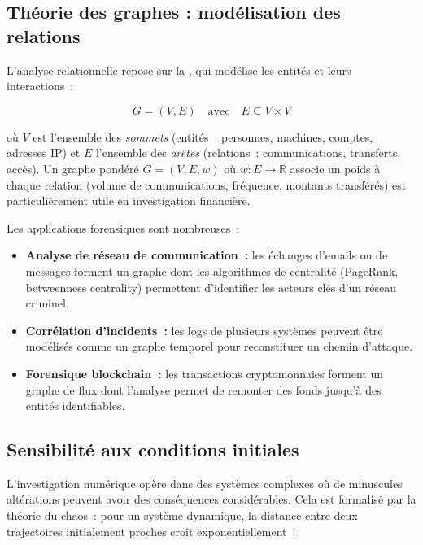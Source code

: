 \subsection{Théorie des graphes : modélisation des relations}

L'analyse relationnelle repose sur la ,
qui modélise les entités et leurs interactions~:

\begin{equation}
G = (V, E) \quad \text{avec} \quad E \subseteq V \times V
\label{eq:graphe}
\end{equation}

où $V$ est l'ensemble des \textit{sommets} (entités~: personnes, machines,
comptes, adresses IP) et $E$ l'ensemble des \textit{arêtes} (relations~:
communications, transferts, accès). Un graphe pondéré $G = (V, E, w)$ où
$w : E \to \mathbb{R}$ associe un poids à chaque relation (volume de
communications, fréquence, montants transférés) est particulièrement
utile en investigation financière.

\medskip

Les applications forensiques sont nombreuses~:

\begin{itemize}
    \item \textbf{Analyse de réseau de communication~:} les échanges d'emails
          ou de messages forment un graphe dont les algorithmes de centralité
          (PageRank, betweenness centrality) permettent d'identifier les
          acteurs clés d'un réseau criminel.
    \item \textbf{Corrélation d'incidents~:} les logs de plusieurs systèmes
          peuvent être modélisés comme un graphe temporel pour reconstituer
          un chemin d'attaque.
    \item \textbf{Forensique blockchain~:} les transactions
          cryptomonnaies forment un graphe de flux dont l'analyse permet
          de remonter des fonds jusqu'à des entités identifiables.
\end{itemize}

\subsection{Sensibilité aux conditions initiales}

L'investigation numérique opère dans des systèmes complexes où de minuscules
altérations peuvent avoir des conséquences considérables. Cela est formalisé
par la théorie du chaos~: pour un système dynamique, la distance entre
deux trajectoires initialement proches croît exponentiellement~:

